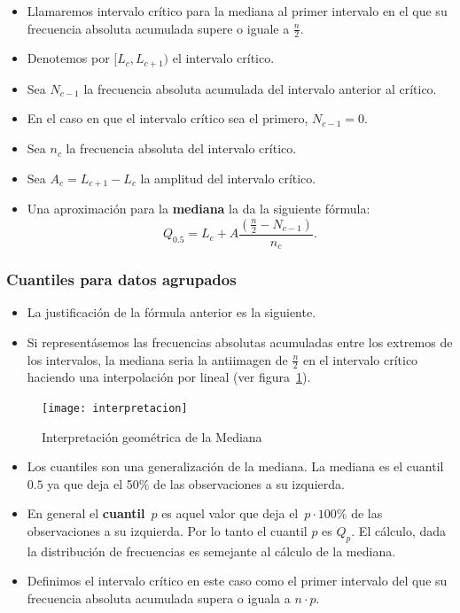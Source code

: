 \begin{frame}
\begin{itemize}
\item Llamaremos intervalo crítico para la mediana al primer intervalo en el que su frecuencia
absoluta acumulada supere o iguale a $\frac{n}{2}$.
\item  Denotemos por $[L_c, L_{c+1})$  el
intervalo crítico.
\item  Sea $N_{c-1}$ la frecuencia absoluta acumulada del intervalo anterior
al crítico.
\item  En el caso en que el intervalo crítico sea  el primero, $N_{c-1}=0$.
\item  Sea $n_c$
la  frecuencia absoluta del intervalo crítico. 
\item Sea  $A_c=L_{c+1}-L_c$ la amplitud del
intervalo crítico. 
\item Una  aproximación para la \textbf{mediana}  la da la siguiente fórmula:
$$Q_{0.5}=L_{c}+A \frac{\left(\frac{n}{2}- N_{c-1}\right)}{n_c}.$$
\end{itemize}
\end{frame}

\begin{frame}
\frametitle{Cuantiles para datos agrupados}
\begin{itemize}
\item La justificación de la fórmula anterior es la siguiente.
\item  Si representásemos las frecuencias absolutas acumuladas entre los extremos de los intervalos, la mediana seria
la antiimagen de $\frac{n}{2}$ en  el intervalo crítico haciendo una interpolación por
lineal (ver figura~\ref{MEDIANA}).
\end{itemize}
\end{frame}

\begin{frame}
\begin{figure}
\begin{center}
\texttt{[image: interpretacion]}
\end{center}
\caption{Interpretación geométrica de la Mediana} \label{MEDIANA}
\end{figure}
\end{frame}

\begin{frame}
\begin{itemize}
\item Los cuantiles son una generalización de la mediana. La mediana es el cuantil $0.5$ ya
que deja el 50\% de las observaciones a su izquierda.
\item En general el \textbf{cuantil}~$p$ es aquel valor que deja el~$p\cdot 100\%$ de las
observaciones a su izquierda. Por  lo tanto el cuantil $p$ es $Q_{p}$.
El cálculo, dada la distribución de frecuencias es semejante al cálculo de la mediana.
\item Definimos el  intervalo crítico  en  este caso  como el primer intervalo del que su
frecuencia absoluta acumulada supera o iguala a $n\cdot p$.
\end{itemize} 
\end{frame}

